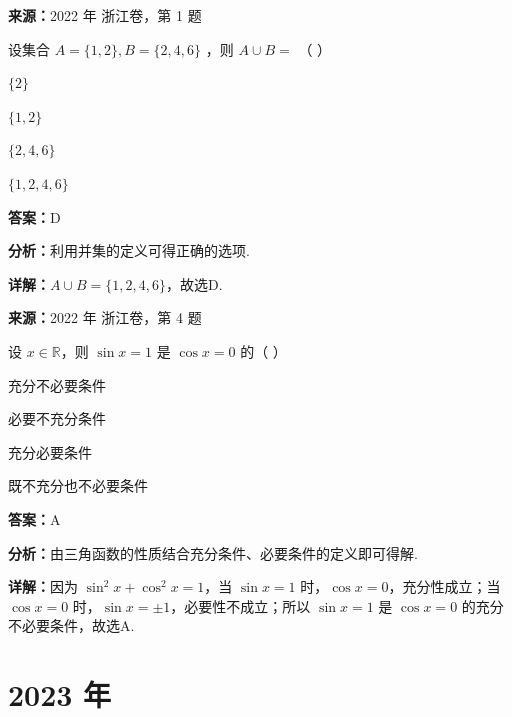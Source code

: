 \begin{question}[points=4]
\textbf{来源：}2022 年 浙江卷，第 1 题\par
设集合 $A = \{1,2\}, B = \{2,4,6\}$ ，则 $A \cup B =$ （ ）
\begin{choices}
  \item $\{2\}$
  \item $\{1,2\}$
  \item $\{2,4,6\}$
  \item $\{1,2,4,6\}$
\end{choices}
\begin{solution}
\textbf{答案：}D

\textbf{分析：}利用并集的定义可得正确的选项.

\textbf{详解：}$A \cup B = \{1,2,4,6\}$，故选D.
\end{solution}
\end{question}

\begin{question}[points=4]
\textbf{来源：}2022 年 浙江卷，第 4 题\par
设 $x \in \mathbb{R}$，则 $\sin x = 1$ 是 $\cos x = 0$ 的（ ）
\begin{choices}
  \item 充分不必要条件
  \item 必要不充分条件
  \item 充分必要条件
  \item 既不充分也不必要条件
\end{choices}
\begin{solution}
\textbf{答案：}A

\textbf{分析：}由三角函数的性质结合充分条件、必要条件的定义即可得解.

\textbf{详解：}因为 $\sin^2 x + \cos^2 x = 1$，当 $\sin x = 1$ 时，$\cos x = 0$，充分性成立；当 $\cos x = 0$ 时，$\sin x = \pm 1$，必要性不成立；所以 $\sin x = 1$ 是 $\cos x = 0$ 的充分不必要条件，故选A.
\end{solution}
\end{question}

\section*{2023 年}

